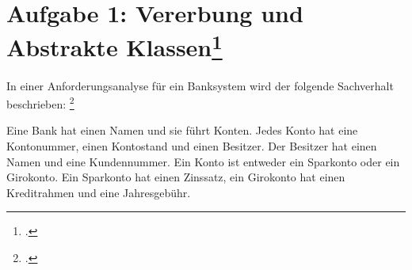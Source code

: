 \documentclass{lehramt-informatik}
\begin{document}
%

\section{Aufgabe 1: Vererbung und Abstrakte Klassen\footcite[(entnommen
aus Algorithmen und Datenstrukturen, 3. \& 4. Übungsblatt, Universität
Bayreuth)]{aud:pu:7}}

\def\TmpHinweis#1{{\footnotesize[#1]}}

In einer Anforderungsanalyse für ein
Banksystem wird der folgende Sachverhalt beschrieben:
\footcite[Objektorientierte Modellierung (aus Stex vertieft
Automatentheorie, Komplexität, Algorithmen, Herbst 02, Thema Nr. 1,
Aufgabe 4)]{examen:66112:2002:09}

Eine Bank hat einen Namen und sie führt Konten. Jedes Konto hat eine
Kontonummer, einen Kontostand und einen Besitzer. Der Besitzer hat einen
Namen und eine Kundennummer. Ein Konto ist entweder ein Sparkonto oder
ein Girokonto. Ein Sparkonto hat einen Zinssatz, ein Girokonto hat einen
Kreditrahmen und eine Jahresgebühr.
\end{document}

